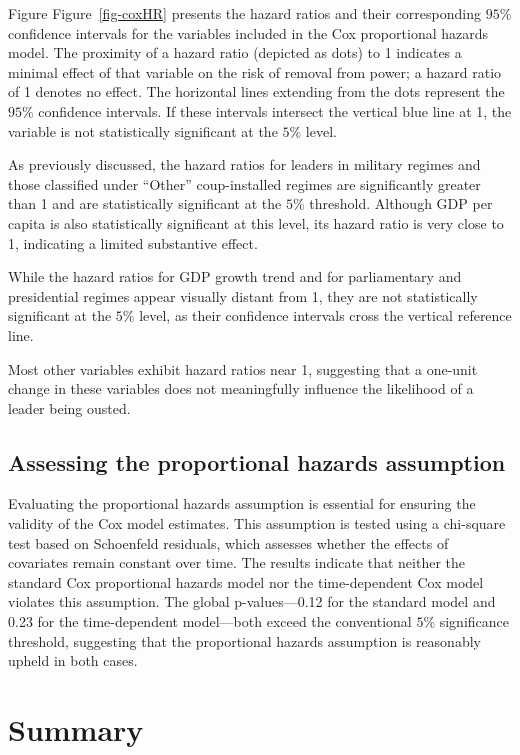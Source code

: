 \documentclass[
  12pt,
]{report}
\begin{document}
Figure Figure~\ref{fig-coxHR} presents the hazard ratios and their
corresponding \(95\%\) confidence intervals for the variables included
in the Cox proportional hazards model. The proximity of a hazard ratio
(depicted as dots) to 1 indicates a minimal effect of that variable on
the risk of removal from power; a hazard ratio of 1 denotes no effect.
The horizontal lines extending from the dots represent the \(95\%\)
confidence intervals. If these intervals intersect the vertical blue
line at 1, the variable is not statistically significant at the \(5\%\)
level.

As previously discussed, the hazard ratios for leaders in military
regimes and those classified under ``Other'' coup-installed regimes are
significantly greater than 1 and are statistically significant at the
\(5\%\) threshold. Although GDP per capita is also statistically
significant at this level, its hazard ratio is very close to 1,
indicating a limited substantive effect.

While the hazard ratios for GDP growth trend and for parliamentary and
presidential regimes appear visually distant from 1, they are not
statistically significant at the \(5\%\) level, as their confidence
intervals cross the vertical reference line.

Most other variables exhibit hazard ratios near 1, suggesting that a
one-unit change in these variables does not meaningfully influence the
likelihood of a leader being ousted.

\subsection{Assessing the proportional hazards
assumption}\label{assessing-the-proportional-hazards-assumption}

Evaluating the proportional hazards assumption is essential for ensuring
the validity of the Cox model estimates. This assumption is tested using
a chi-square test based on Schoenfeld residuals, which assesses whether
the effects of covariates remain constant over time. The results
indicate that neither the standard Cox proportional hazards model nor
the time-dependent Cox model violates this assumption. The global
p-values---0.12 for the standard model and 0.23 for the time-dependent
model---both exceed the conventional \(5\%\) significance threshold,
suggesting that the proportional hazards assumption is reasonably upheld
in both cases.

\section{Summary}\label{summary-2}
\end{document}
